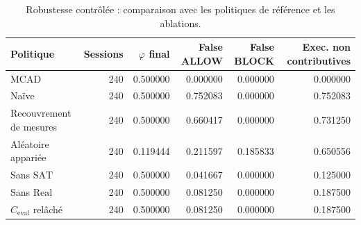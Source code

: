 \begin{table}[!t]
\centering
\caption{Robustesse contrôlée : comparaison avec les politiques de référence et les ablations.}
\label{tab:robustness}
\small
\begin{tabular}{@{}p{}rrrrr@{}}
\toprule
Politique & Sessions & $\varphi$ final & False ALLOW & False BLOCK & Exec. non contributives \\
\midrule
MCAD & 240 & 0.500000 & 0.000000 & 0.000000 & 0.000000 \\
Naïve & 240 & 0.500000 & 0.752083 & 0.000000 & 0.752083 \\
Recouvrement de mesures & 240 & 0.500000 & 0.660417 & 0.000000 & 0.731250 \\
Aléatoire appariée & 240 & 0.119444 & 0.211597 & 0.185833 & 0.650556 \\
Sans $\mathrm{SAT}$ & 240 & 0.500000 & 0.041667 & 0.000000 & 0.125000 \\
Sans $\mathrm{Real}$ & 240 & 0.500000 & 0.081250 & 0.000000 & 0.187500 \\
$C_{\mathrm{eval}}$ relâché & 240 & 0.500000 & 0.081250 & 0.000000 & 0.187500 \\
\bottomrule
\end{tabular}
\end{table}
